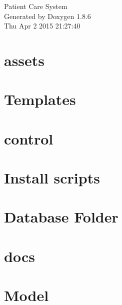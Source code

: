 \documentclass[twoside]{book}
\newcommand{\clearemptydoublepage}{%
  \newpage{\pagestyle{empty}\cleardoublepage}%
}
\begin{document}
\hypersetup{pageanchor=false}
\begin{titlepage}
\vspace*{7cm}
\begin{center}%
{\Large Patient Care System }\\
\vspace*{1cm}
{\large Generated by Doxygen 1.8.6}\\
\vspace*{0.5cm}
{\small Thu Apr 2 2015 21:27:40}\\
\end{center}
\end{titlepage}
\clearemptydoublepage
\tableofcontents
\clearemptydoublepage
{}
\hypersetup{pageanchor=true}

\chapter{assets}
\label{md_assets_readme}
\hypertarget{md_assets_readme}{}

\chapter{Templates}
\label{md_assets_template_readme}
\hypertarget{md_assets_template_readme}{}

\chapter{control}
\label{md_control_readme}
\hypertarget{md_control_readme}{}

\chapter{Install scripts}
\label{md_db_db_install_scripts_readme}
\hypertarget{md_db_db_install_scripts_readme}{}

\chapter{Database Folder}
\label{md_db_readme}
\hypertarget{md_db_readme}{}

\chapter{docs}
\label{md_docs_readme}
\hypertarget{md_docs_readme}{}

\chapter{Model}
\label{md_model_readme}
\hypertarget{md_model_readme}{}

\end{document}
